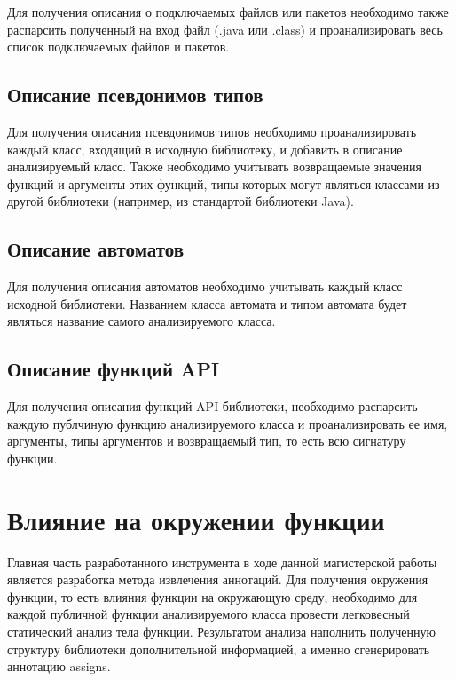 Для получения описания о подключаемых файлов или пакетов необходимо также распарсить полученный на вход файл (.java или .class) и проанализировать весь список подключаемых файлов и пакетов.

\subsection{Описание псевдонимов типов}

Для получения описания псевдонимов типов необходимо проанализировать каждый класс, входящий в исходную библиотеку, и добавить в описание анализируемый класс.
Также необходимо учитывать возвращаемые значения функций и аргументы этих функций, типы которых могут являться классами из другой библиотеки (например, из стандартой библиотеки Java).

\subsection{Описание автоматов}

Для получения описания автоматов необходимо учитывать каждый класс исходной библиотеки.
Названием класса автомата и типом автомата будет являться название самого анализируемого класса.

\subsection{Описание функций API}

Для получения описания функций API библиотеки, необходимо распарсить каждую публчиную функцию анализируемого класса и проанализировать ее имя, аргументы, типы аргументов и возвращаемый тип, то есть всю сигнатуру функции.

\section{Влияние на окружении функции}

Главная часть разработанного инструмента в ходе данной магистерской работы является разработка метода извлечения аннотаций.
Для получения окружения функции, то есть влияния функции на окружающую среду, необходимо для каждой публичной функции анализируемого класса провести легковесный статический анализ тела функции.
Результатом анализа наполнить полученную структуру библиотеки дополнительной информацией, а именно сгенерировать аннотацию assigns.

